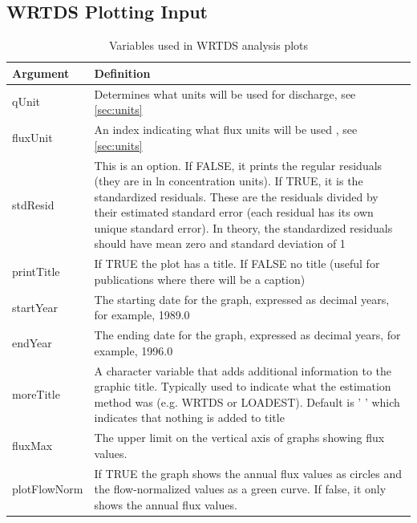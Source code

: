 \documentclass[a4paper,11pt]{article}\usepackage{graphicx, color}
\begin{document}
\FloatBarrier
\clearpage

\subsection{WRTDS Plotting Input}
\label{sec:wrtdsOutputVariables}

\begin{table}[ht]
\caption{Variables used in WRTDS analysis plots  \label{tab:wrtdsVariables}}
\begin{tabularx}{\textwidth}{lX}
\hline
  \textbf{Argument} & \textbf{Definition} \\
\hline
qUnit & Determines what units will be used for discharge, see \ref{sec:units}\\
fluxUnit & An index indicating what flux units will be used , see \ref{sec:units}\\
stdResid & This is an option.  If FALSE, it prints the regular residuals (they are in ln concentration units).  If TRUE, it is the standardized residuals.  These are the residuals divided by their estimated standard error (each residual has its own unique standard error).  In theory, the standardized residuals should have mean zero and standard deviation of 1 \\
printTitle & If TRUE the plot has a title.  If FALSE no title (useful for publications where there will be a caption) \\
startYear & The starting date for the graph, expressed as decimal years, for example, 1989.0 \\
endYear & The ending date for the graph, expressed as decimal years, for example, 1996.0 \\
moreTitle & A character variable that adds additional information to the graphic title.  Typically used to indicate what the estimation method was (e.g. WRTDS or LOADEST).  Default is ' ' which indicates that nothing is added to title \\
fluxMax & The upper limit on the vertical axis of graphs showing flux values.  \\
plotFlowNorm & If TRUE the graph shows the annual flux values as circles and the flow-normalized values as a green curve.  If false, it only shows the annual flux values.\\
\hline
\end{tabularx}

\end{table}
\end{document}
